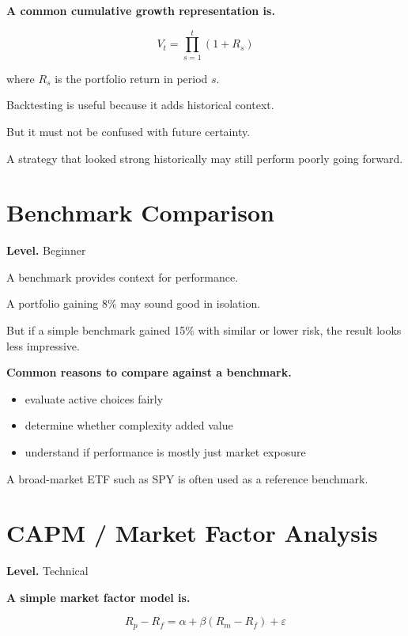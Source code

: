 \documentclass[11pt]{report}
\begin{document}
\textbf{A common cumulative growth representation is.}

\begin{equation}
V_t = \prod_{s=1}^{t} (1 + R_s)
\end{equation}

where $R_s$ is the portfolio return in period $s$.

Backtesting is useful because it adds historical context.

But it must not be confused with future certainty.

A strategy that looked strong historically may still perform poorly going forward.

\section{Benchmark Comparison}
\begin{callout}
\textbf{Level.} Beginner
\end{callout}

A benchmark provides context for performance.

A portfolio gaining 8\% may sound good in isolation.

But if a simple benchmark gained 15\% with similar or lower risk, the result looks less impressive.

\textbf{Common reasons to compare against a benchmark.}

\begin{itemize}
\item evaluate active choices fairly
\item determine whether complexity added value
\item understand if performance is mostly just market exposure
\end{itemize}

A broad-market ETF such as SPY is often used as a reference benchmark.

\section{CAPM / Market Factor Analysis}
\begin{callout}
\textbf{Level.} Technical
\end{callout}

\textbf{A simple market factor model is.}

\begin{equation}
R_p - R_f = \alpha + \beta (R_m - R_f) + \varepsilon
\end{equation}
\end{document}
